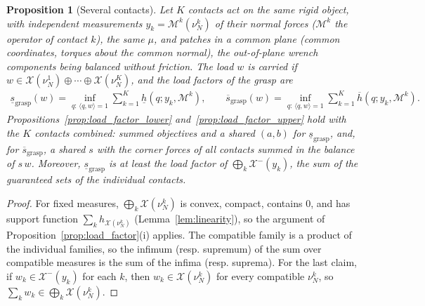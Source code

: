 \documentclass[11pt,a4paper]{article}
\theoremstyle{plain}
\newtheorem{proposition}[theorem]{Proposition}
\newcommand{\X}{\mathcal X}
\begin{document}
\begin{proposition}[Several contacts]
\label{prop:load_factor_grasp}
    Let $K$ contacts act on the same rigid object, with independent measurements $y_k=\mathcal M^k(\nu^k_N)$ of their normal forces ($\mathcal M^k$ the operator of contact $k$), the same $\mu$, and patches in a common plane (common coordinates, torques about the common
    normal), the out-of-plane wrench components being balanced without friction. The load $w$ is carried if $w\in\X(\nu^1_N)\oplus\cdots\oplus\X(\nu^K_N)$, and the load factors of the grasp are
    \begin{align}
        \boxed{\underline s_{\mathrm{grasp}}(w)=\inf_{q:\,\langle q,w\rangle=1}\sum_{k=1}^K\underline h(q;y_k,\mathcal M^k),
        \qquad
        \overline s_{\mathrm{grasp}}(w)=\inf_{q:\,\langle q,w\rangle=1}\sum_{k=1}^K\overline h(q;y_k,\mathcal M^k).}
    \end{align}
    Propositions~\ref{prop:load_factor_lower} and~\ref{prop:load_factor_upper} hold with the $K$ contacts combined: summed objectives and a shared $(a,b)$ for $\underline s_{\mathrm{grasp}}$, and, for $\overline s_{\mathrm{grasp}}$, a shared $s$ with the corner forces of all contacts summed in the balance of $s\,w$.
    Moreover, $\underline s_{\mathrm{grasp}}$ is at least the load factor of $\bigoplus_k\X^-(y_k)$, the sum of the guaranteed sets of the individual contacts.
\end{proposition}
\begin{proof}
    For fixed measures, $\bigoplus_k\X(\nu^k_N)$ is convex, compact, contains $0$, and has support function $\sum_kh_{\X(\nu^k_N)}$ (Lemma~\ref{lem:linearity}), so the argument of
    Proposition~\ref{prop:load_factor}(i) applies. The compatible family is a product of the individual families, so the infimum (resp. supremum) of the sum over compatible measures is the sum of the
    infima (resp. suprema). For the last claim, if $w_k\in\X^-(y_k)$ for each $k$, then $w_k\in\X(\nu^k_N)$ for every compatible $\nu^k_N$, so $\sum_kw_k\in\bigoplus_k\X(\nu^k_N)$.
\end{proof}

\end{document}
